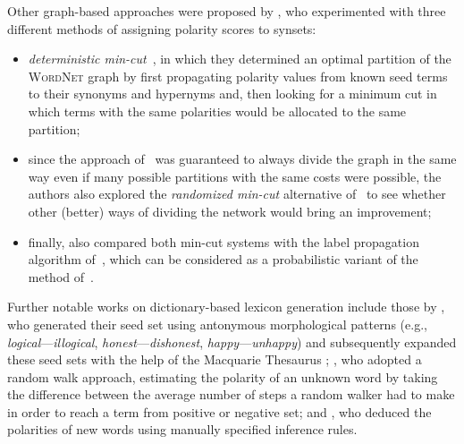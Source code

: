 Other graph-based approaches were proposed by \citet{Rao:09}, who
experimented with three different methods of assigning polarity scores
to synsets:
\begin{itemize}
\item\emph{deterministic min-cut}~\cite{Blum:01}, in which they
  determined an optimal partition of the \textsc{WordNet} graph by
  first propagating polarity values from known seed terms to their
  synonyms and hypernyms and, then looking for a minimum cut in which
  terms with the same polarities would be allocated to the same
  partition;
\item since the approach of~\citet{Blum:01} was guaranteed to always
  divide the graph in the same way even if many possible partitions
  with the same costs were possible, the authors also explored the
  \emph{randomized min-cut} alternative of~\citet{Blum:04} to see
  whether other (better) ways of dividing the network would bring an
  improvement;
\item finally, \citet{Rao:09} also compared both min-cut systems with
  the label propagation algorithm of~\citet{Zhu:02}, which can be
  considered as a probabilistic variant of the method
  of~\citet{Blair-Goldensohn:08}.
\end{itemize}

Further notable works on dictionary-based lexicon generation include
those by \citet{Mohammad:09}, who generated their seed set using
antonymous morphological patterns (e.g.,
\emph{logical}---\emph{illogical}, \emph{honest}---\emph{dishonest},
\emph{happy}---\emph{unhappy}) and subsequently expanded these seed
sets with the help of the Macquarie Thesaurus \cite{Bernard:86};
\citet{Awadallah:10}, who adopted a random walk approach, estimating
the polarity of an unknown word by taking the difference between the
average number of steps a random walker had to make in order to reach
a term from positive or negative set; and \citet{Dragut:10}, who
deduced the polarities of new words using manually specified inference
rules.


